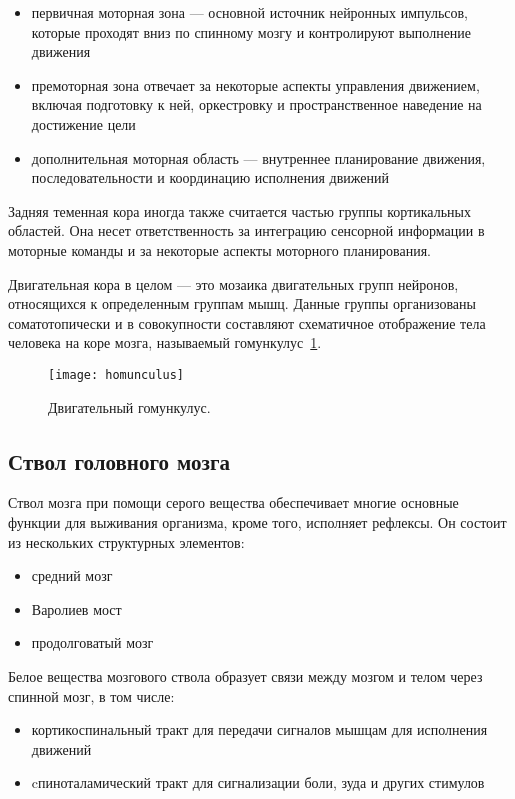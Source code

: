 \begin{itemize}
	\item первичная моторная зона --- основной источник нейронных импульсов, которые проходят вниз по спинному мозгу и контролируют выполнение движения
	\item премоторная зона отвечает за некоторые аспекты управления движением, включая подготовку к ней, оркестровку и пространственное наведение на достижение цели
	\item дополнительная моторная область --- внутреннее планирование движения, последовательности и координацию исполнения движений
\end{itemize}
Задняя теменная кора иногда также считается частью группы кортикальных областей.
Она несет ответственность за интеграцию сенсорной информации в моторные команды и за некоторые аспекты моторного планирования.~\cite{motorcortex}

Двигательная кора в целом --- это мозаика двигательных групп нейронов, относящихся к определенным группам мышц. Данные группы организованы соматотопически и в совокупности составляют схематичное отображение тела человека на коре мозга, называемый гомункулус~\ref{fig:homunculus}.
\begin{figure}
	\centering
	\texttt{[image: homunculus]}
	\caption{Двигательный гомункулус. }
	\label{fig:homunculus}
\end{figure}

\subsection{Ствол головного мозга}
Ствол мозга при помощи серого вещества обеспечивает многие основные функции для выживания организма, кроме того, исполняет рефлексы. Он состоит из нескольких структурных элементов: 
\begin{itemize}
	\item средний мозг
	\item Варолиев мост
	\item продолговатый мозг
\end{itemize}
Белое вещества мозгового ствола образует связи между мозгом и телом через спинной мозг, в том числе:
\begin{itemize}
	\item кортикоспинальный тракт для передачи сигналов мышцам для исполнения движений
	\item cпиноталамический тракт для сигнализации боли, зуда и других стимулов
\end{itemize}

